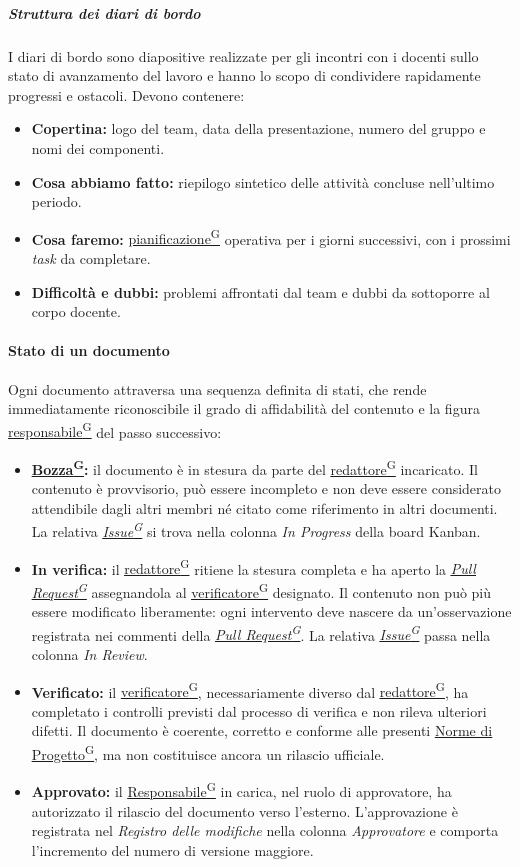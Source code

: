 \documentclass[a4paper,12pt]{article}
\providecommand{\glslink}[2]{\href{https://alittlebyte-19.github.io/Documentazione/glossario.html\#gls-#1}{\underline{#2}\textsuperscript{\scriptsize G}}}
\begin{document}
\subparagraph{Struttura dei diari di bordo}
I diari di bordo sono diapositive realizzate per gli incontri con i docenti sullo stato di avanzamento del lavoro e hanno lo scopo di condividere rapidamente progressi e ostacoli. Devono contenere:
\begin{itemize}
    \item \textbf{Copertina:} logo del team, data della presentazione, numero del gruppo e nomi dei componenti.
    \item \textbf{Cosa abbiamo fatto:} riepilogo sintetico delle attività concluse nell'ultimo periodo.
    \item \textbf{Cosa faremo:} \glslink{pianificazione}{pianificazione} operativa per i giorni successivi, con i prossimi \textit{task} da completare.
    \item \textbf{Difficoltà e dubbi:} problemi affrontati dal team e dubbi da sottoporre al corpo docente.
\end{itemize}

\paragraph{Stato di un documento}\label{sec:stato-documento}
Ogni documento attraversa una sequenza definita di stati, che rende immediatamente riconoscibile il grado di affidabilità del contenuto e la figura \glslink{responsabile}{responsabile} del passo successivo:

\begin{itemize}
    \item \textbf{\glslink{bozza-draft}{Bozza}:} il documento è in stesura da parte del \glslink{redattore}{redattore} incaricato. Il contenuto è provvisorio, può essere incompleto e non deve essere considerato attendibile dagli altri membri né citato come riferimento in altri documenti. La relativa \textit{\glslink{issue}{Issue}} si trova nella colonna \textit{In Progress} della board Kanban.
    \item \textbf{In verifica:} il \glslink{redattore}{redattore} ritiene la stesura completa e ha aperto la \textit{\glslink{pull-request}{Pull Request}} assegnandola al \glslink{verificatore}{verificatore} designato. Il contenuto non può più essere modificato liberamente: ogni intervento deve nascere da un'osservazione registrata nei commenti della \textit{\glslink{pull-request}{Pull Request}}. La relativa \textit{\glslink{issue}{Issue}} passa nella colonna \textit{In Review}.
    \item \textbf{Verificato:} il \glslink{verificatore}{verificatore}, necessariamente diverso dal \glslink{redattore}{redattore}, ha completato i controlli previsti dal processo di verifica e non rileva ulteriori difetti. Il documento è coerente, corretto e conforme alle presenti \glslink{norme-di-progetto}{Norme di Progetto}, ma non costituisce ancora un rilascio ufficiale.
    \item \textbf{Approvato:} il \glslink{responsabile}{Responsabile} in carica, nel ruolo di approvatore, ha autorizzato il rilascio del documento verso l'esterno. L'approvazione è registrata nel \textit{Registro delle modifiche} nella colonna \textit{Approvatore} e comporta l'incremento del numero di versione maggiore.
\end{itemize}
\end{document}

